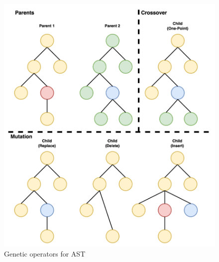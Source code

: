 \documentclass[10pt,conference]{IEEEtran}
\begin{document}
        \begin{figure}[b!]
            \centering
            \includegraphics[scale=0.4]{repair.png}
            \caption{Genetic operators for AST}
            \label{fig:repair}
        \end{figure}
\end{document}
